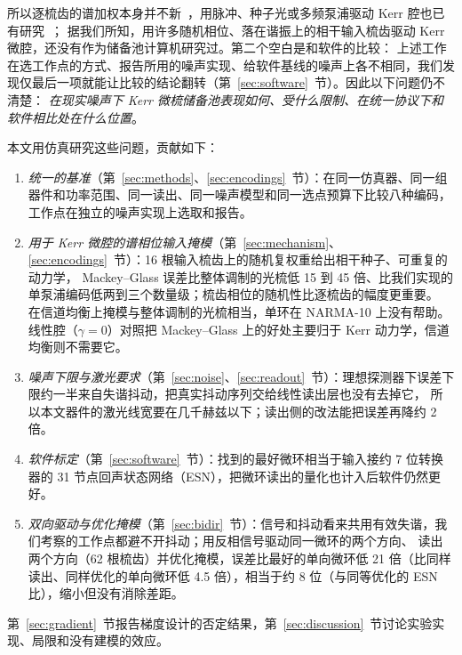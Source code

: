 所以逐梳齿的谱加权本身并不新~\cite{butschek2020,lupo2021}，用脉冲、种子光或多频泵浦驱动 Kerr 腔也已有研究~\cite{obrzud2017,papp2013,hansson2014}；
据我们所知，用许多随机相位、落在谐振上的相干输入梳齿驱动 Kerr 微腔，还没有作为储备池计算机研究过。第二个空白是和软件的比较：
上述工作在选工作点的方式、报告所用的噪声实现、给软件基线的噪声上各不相同，我们发现仅最后一项就能让比较的结论翻转（第~\ref{sec:software}~节）。因此以下问题仍不清楚：
\emph{在现实噪声下 Kerr 微梳储备池表现如何、受什么限制、在统一协议下和软件相比处在什么位置}。

本文用仿真研究这些问题，贡献如下：
\begin{enumerate}
\item \emph{统一的基准}（第~\ref{sec:methods}、\ref{sec:encodings}~节）：在同一仿真器、同一组器件和功率范围、同一读出、同一噪声模型和同一选点预算下比较八种编码，
      工作点在独立的噪声实现上选取和报告。
\item \emph{用于 Kerr 微腔的谱相位输入掩模}（第~\ref{sec:mechanism}、\ref{sec:encodings}~节）：16 根输入梳齿上的随机复权重给出相干种子、可重复的动力学，
      Mackey--Glass 误差比整体调制的光梳低 15 到 45 倍、比我们实现的单泵浦编码低两到三个数量级；梳齿相位的随机性比逐梳齿的幅度更重要。
      在信道均衡上掩模与整体调制的光梳相当，单环在 NARMA-10 上没有帮助。
      线性腔（$\gamma=0$）对照把 Mackey--Glass 上的好处主要归于 Kerr 动力学，信道均衡则不需要它。
\item \emph{噪声下限与激光要求}（第~\ref{sec:noise}、\ref{sec:readout}~节）：理想探测器下误差下限约一半来自失谐抖动，把真实抖动序列交给线性读出层也没有去掉它，
      所以本文器件的激光线宽要在几千赫兹以下；读出侧的改法能把误差再降约 2 倍。
\item \emph{软件标定}（第~\ref{sec:software}~节）：找到的最好微环相当于输入接约 7 位转换器的 31 节点回声状态网络（ESN），把微环读出的量化也计入后软件仍然更好。
\item \emph{双向驱动与优化掩模}（第~\ref{sec:bidir}~节）：信号和抖动看来共用有效失谐，我们考察的工作点都避不开抖动；用反相信号驱动同一微环的两个方向、
      读出两个方向（62 根梳齿）并优化掩模，误差比最好的单向微环低 21 倍（比同样读出、同样优化的单向微环低 4.5 倍），相当于约 8 位（与同等优化的 ESN 比），缩小但没有消除差距。
\end{enumerate}
第~\ref{sec:gradient}~节报告梯度设计的否定结果，第~\ref{sec:discussion}~节讨论实验实现、局限和没有建模的效应。
